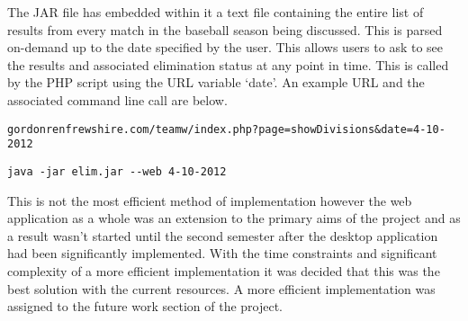 The JAR file has embedded within it a text file containing the entire list of
results from every match in the baseball season being discussed. This is parsed
on-demand up to the date specified by the user. This allows users to ask to see 
the results and associated elimination status at any point in time. This is
called by the PHP script using the URL variable `date'. An example URL and
the associated command line call are below.

\begin{verbatim}
gordonrenfrewshire.com/teamw/index.php?page=showDivisions&date=4-10-2012
\end{verbatim}

\begin{verbatim}
java -jar elim.jar --web 4-10-2012
\end{verbatim}

This is not 
the most efficient method of implementation however the web application as a 
whole was an extension to the primary aims of the project and as a result wasn't 
started until the second semester after the desktop application had been 
significantly implemented. With the time constraints and significant complexity 
of a more efficient implementation it was decided that this was the best 
solution with the current resources. A more efficient implementation was 
assigned to the future work section of the project.


